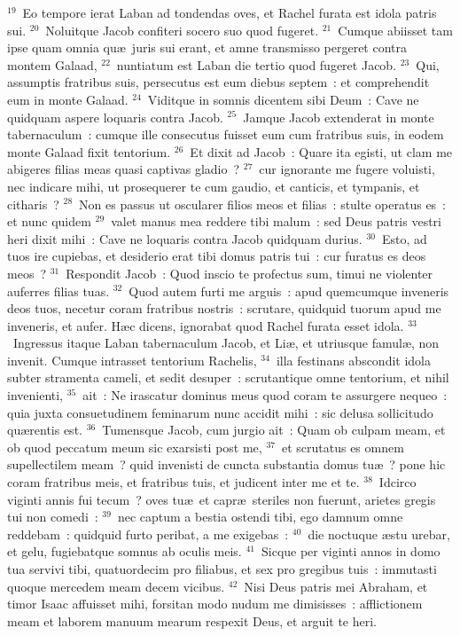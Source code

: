 ${}^{19}$~Eo tempore ierat Laban ad tondendas oves, et Rachel furata est idola patris sui.
${}^{20}$~Noluitque Jacob confiteri socero suo quod fugeret.
${}^{21}$~Cumque abiisset tam ipse quam omnia qu\ae\ juris sui erant, et amne transmisso pergeret contra montem Galaad,
${}^{22}$~nuntiatum est Laban die tertio quod fugeret Jacob.
${}^{23}$~Qui, assumptis fratribus suis, persecutus est eum diebus septem~: et comprehendit eum in monte Galaad.
${}^{24}$~Viditque in somnis dicentem sibi Deum~: Cave ne quidquam aspere loquaris contra Jacob.
${}^{25}$~Jamque Jacob extenderat in monte tabernaculum~: cumque ille consecutus fuisset eum cum fratribus suis, in eodem monte Galaad fixit tentorium.
${}^{26}$~Et dixit ad Jacob~: Quare ita egisti, ut clam me abigeres filias meas quasi captivas gladio~?
${}^{27}$~cur ignorante me fugere voluisti, nec indicare mihi, ut prosequerer te cum gaudio, et canticis, et tympanis, et citharis~?
${}^{28}$~Non es passus ut oscularer filios meos et filias~: stulte operatus es~: et nunc quidem
${}^{29}$~valet manus mea reddere tibi malum~: sed Deus patris vestri heri dixit mihi~: Cave ne loquaris contra Jacob quidquam durius.
${}^{30}$~Esto, ad tuos ire cupiebas, et desiderio erat tibi domus patris tui~: cur furatus es deos meos~?
${}^{31}$~Respondit Jacob~: Quod inscio te profectus sum, timui ne violenter auferres filias tuas.
${}^{32}$~Quod autem furti me arguis~: apud quemcumque inveneris deos tuos, necetur coram fratribus nostris~: scrutare, quidquid tuorum apud me inveneris, et aufer. H\ae c dicens, ignorabat quod Rachel furata esset idola.
${}^{33}$~Ingressus itaque Laban tabernaculum Jacob, et Li\ae , et utriusque famul\ae , non invenit. Cumque intrasset tentorium Rachelis,
${}^{34}$~illa festinans abscondit idola subter stramenta cameli, et sedit desuper~: scrutantique omne tentorium, et nihil invenienti,
${}^{35}$~ait~: Ne irascatur dominus meus quod coram te assurgere nequeo~: quia juxta consuetudinem feminarum nunc accidit mihi~: sic delusa sollicitudo qu\ae rentis est.
${}^{36}$~Tumensque Jacob, cum jurgio ait~: Quam ob culpam meam, et ob quod peccatum meum sic exarsisti post me,
${}^{37}$~et scrutatus es omnem supellectilem meam~? quid invenisti de cuncta substantia domus tu\ae~? pone hic coram fratribus meis, et fratribus tuis, et judicent inter me et te.
${}^{38}$~Idcirco viginti annis fui tecum~? oves tu\ae\ et capr\ae\ steriles non fuerunt, arietes gregis tui non comedi~:
${}^{39}$~nec captum a bestia ostendi tibi, ego damnum omne reddebam~: quidquid furto peribat, a me exigebas~:
${}^{40}$~die noctuque \ae stu urebar, et gelu, fugiebatque somnus ab oculis meis.
${}^{41}$~Sicque per viginti annos in domo tua servivi tibi, quatuordecim pro filiabus, et sex pro gregibus tuis~: immutasti quoque mercedem meam decem vicibus.
${}^{42}$~Nisi Deus patris mei Abraham, et timor Isaac affuisset mihi, forsitan modo nudum me dimisisses~: afflictionem meam et laborem manuum mearum respexit Deus, et arguit te heri.


